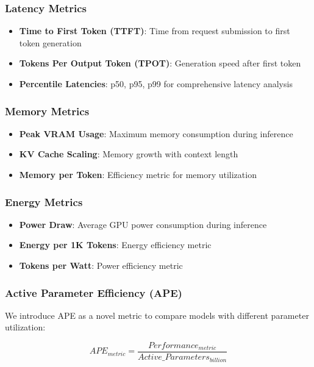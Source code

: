 \documentclass[11pt]{article}
\begin{document}
\subsubsection{Latency Metrics}
\begin{itemize}
    \item \textbf{Time to First Token (TTFT)}: Time from request submission to first token generation
    \item \textbf{Tokens Per Output Token (TPOT)}: Generation speed after first token
    \item \textbf{Percentile Latencies}: p50, p95, p99 for comprehensive latency analysis
\end{itemize}

\subsubsection{Memory Metrics}
\begin{itemize}
    \item \textbf{Peak VRAM Usage}: Maximum memory consumption during inference
    \item \textbf{KV Cache Scaling}: Memory growth with context length
    \item \textbf{Memory per Token}: Efficiency metric for memory utilization
\end{itemize}

\subsubsection{Energy Metrics}
\begin{itemize}
    \item \textbf{Power Draw}: Average GPU power consumption during inference
    \item \textbf{Energy per 1K Tokens}: Energy efficiency metric
    \item \textbf{Tokens per Watt}: Power efficiency metric
\end{itemize}

\subsubsection{Active Parameter Efficiency (APE)}
We introduce APE as a novel metric to compare models with different parameter utilization:

\begin{equation}
APE_{metric} = \frac{Performance_{metric}}{Active\_Parameters_{billion}}
\end{equation}
\end{document}
